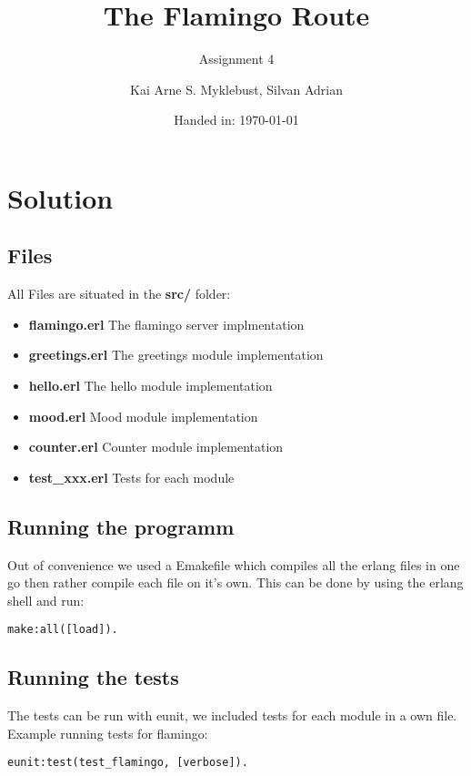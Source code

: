 \documentclass[12pt,a4paper]{article}
\begin{document}
\title{The Flamingo Route}
\subtitle{Assignment 4}

\author{Kai Arne S. Myklebust, Silvan Adrian}
\date{Handed in: \today}
	
\maketitle
\tableofcontents

\section{Solution}

\subsection{Files}
All Files are situated in the \textbf{src/} folder:
\begin{itemize}
	\item \textbf{flamingo.erl} The flamingo server implmentation
	\item \textbf{greetings.erl} The greetings module implementation
	\item \textbf{hello.erl} The hello module implementation
	\item \textbf{mood.erl} Mood module implementation
	\item \textbf{counter.erl} Counter module implementation
	\item \textbf{test\_xxx.erl} Tests for each module
\end{itemize}

\subsection{Running the programm}
Out of convenience we used a Emakefile which compiles all the erlang files in one go then rather compile each file on it's own.
This can be done by using the erlang shell and run:

\begin{verbatim}
make:all([load]).
\end{verbatim}

\subsection{Running the tests}
The tests can be run with eunit, we included tests for each module in a own file.
Example running tests for flamingo:
\begin{verbatim}
eunit:test(test_flamingo, [verbose]).
\end{verbatim}
\end{document}
